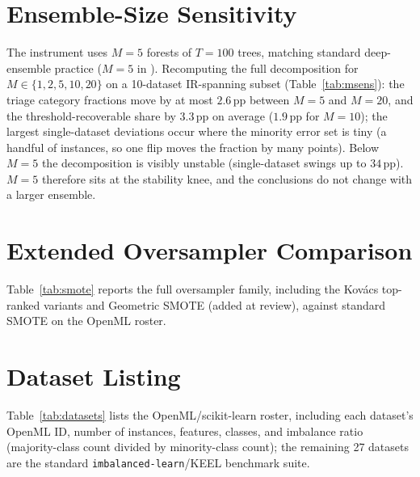 \section{Ensemble-Size Sensitivity}\label{app:msens}

The instrument uses $M{=}5$ forests of $T{=}100$ trees, matching standard
deep-ensemble practice ($M{=}5$ in \cite{lakshminarayanan2017simple}).
Recomputing the full decomposition for $M \in \{1,2,5,10,20\}$ on a
10-dataset IR-spanning subset (Table~\ref{tab:msens}): the triage category
fractions move by at most $2.6$\,pp between $M{=}5$ and $M{=}20$, and the
threshold-recoverable share by $3.3$\,pp on average ($1.9$\,pp for $M{=}10$);
the largest single-dataset deviations occur where the minority error set is
tiny (a handful of instances, so one flip moves the fraction by many points).
Below $M{=}5$ the decomposition is visibly unstable (single-dataset swings up
to $34$\,pp). $M{=}5$ therefore sits at
the stability knee, and the conclusions do not change with a larger ensemble.

\begin{table}[t]
\centering
\caption{Ensemble-size sensitivity: mean threshold-recoverable share and
absolute deviations from the $M{=}5$ reference across 10 datasets.}
\label{tab:msens}
\footnotesize

\end{table}

\section{Extended Oversampler Comparison}\label{app:oversamplers}

Table~\ref{tab:smote} reports the full oversampler family, including the
Kov\'acs top-ranked variants and Geometric SMOTE (added at review), against
standard SMOTE on the OpenML roster.



\clearpage
\section{Dataset Listing}\label{app:datasets}

Table~\ref{tab:datasets} lists the OpenML/scikit-learn roster, including
each dataset's OpenML ID, number of instances, features, classes, and imbalance
ratio (majority-class count divided by minority-class count); the remaining 27
datasets are the standard \texttt{imbalanced-learn}/KEEL benchmark suite.


